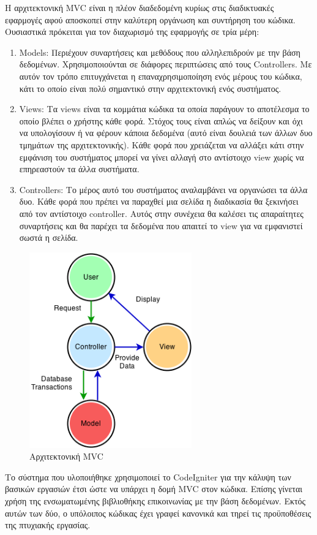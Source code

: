 Η αρχιτεκτονική MVC είναι η πλέον διαδεδομένη κυρίως στις διαδικτυακές εφαρμογές αφού αποσκοπεί στην καλύτερη οργάνωση και συντήρηση του κώδικα. Ουσιαστικά πρόκειται για τον διαχωρισμό της εφαρμογής σε τρία μέρη:
\begin{enumerate}
\item Models: Περιέχουν συναρτήσεις και μεθόδους που αλληλεπιδρούν με την βάση δεδομένων. Χρησιμοποιούνται σε διάφορες περιπτώσεις από τους Controllers. Με αυτόν τον τρόπο επιτυγχάνεται η επαναχρησιμοποίηση ενός μέρους του κώδικα, κάτι το οποίο είναι πολύ σημαντικό στην αρχιτεκτονική ενός συστήματος.
\item Views: Τα views είναι τα κομμάτια κώδικα τα οποία παράγουν το αποτέλεσμα το οποίο βλέπει ο χρήστης κάθε φορά. Στόχος τους είναι απλώς να δείξουν και όχι να υπολογίσουν ή να φέρουν κάποια δεδομένα (αυτό είναι δουλειά των άλλων δυο τμημάτων της αρχιτεκτονικής). Κάθε φορά που χρειάζεται να αλλάξει κάτι στην εμφάνιση του συστήματος μπορεί να γίνει αλλαγή στο αντίστοιχο view χωρίς να επηρεαστούν τα άλλα συστήματα. 
\item Controllers: Το μέρος αυτό του συστήματος αναλαμβάνει να οργανώσει τα άλλα δυο. Κάθε φορά που πρέπει να παραχθεί μια σελίδα η διαδικασία θα ξεκινήσει από τον αντίστοιχο controller. Αυτός στην συνέχεια θα καλέσει τις απαραίτητες συναρτήσεις και θα παρέχει τα δεδομένα που απαιτεί το view για να εμφανιστεί σωστά η σελίδα.
\end{enumerate}

\begin{figure}
\centering
\includegraphics[width=70mm]{images/mvc.png}
\caption{Αρχιτεκτονική MVC}
\label{mvc}
\end{figure}

Το σύστημα που υλοποιήθηκε χρησιμοποιεί το CodeIgniter για την κάλυψη των βασικών εργασιών έτσι ώστε να υπάρχει η δομή MVC στον κώδικα. Επίσης γίνεται χρήση της ενσωματωμένης βιβλιοθήκης επικοινωνίας με την βάση δεδομένων. Εκτός αυτών των δύο, ο υπόλοιπος κώδικας έχει γραφεί κανονικά και τηρεί τις προϋποθέσεις της πτυχιακής εργασίας.

